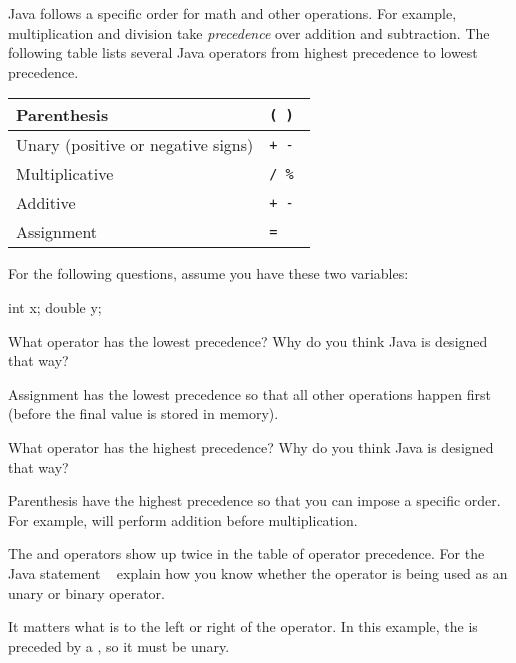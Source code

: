
Java follows a specific order for math and other operations. For example, multiplication and division take \emph{precedence} over addition and subtraction.
The following table lists several Java operators from highest precedence to lowest precedence.

\begin{center}
\begin{tabular}{|L{3in}|L{1in}|}
\hline
Parenthesis
& \tt ( ) \\
\hline
Unary (positive or negative signs)
& \tt + - \\
\hline
Multiplicative
& \tt * / \% \\
\hline
Additive
& \tt + - \\
\hline
Assignment
& \tt = \\
\hline
\end{tabular}
\end{center}

For the following questions, assume you have these two variables:

\begin{javalst}
    int x;
    double y;
\end{javalst}




\Q What operator has the lowest precedence?
Why do you think Java is designed that way?

\begin{answer}
Assignment has the lowest precedence so that all other operations happen first (before the final value is stored in memory).
\end{answer}


\Q What operator has the highest precedence?
Why do you think Java is designed that way?

\begin{answer}
Parenthesis have the highest precedence so that you can impose a specific order.
For example,  will perform addition before multiplication.
\end{answer}


\Q The \java{+} and \java{-} operators show up twice in the table of operator precedence.
For the Java statement ~ explain how you know whether the \java{-} operator is being used as an unary or binary operator.

\begin{answer}
It matters what is to the left or right of the operator.
In this example, the \java{-} is preceded by a \java{*}, so it must be unary.
\end{answer}


